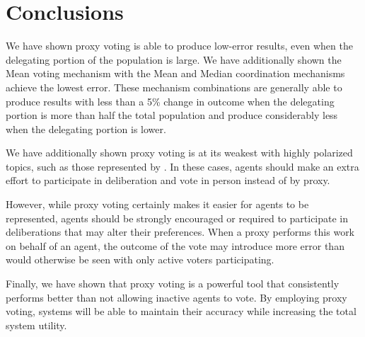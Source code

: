 \section{Conclusions}\label{sec:conclusions}
We have shown proxy voting is able to produce low-error results, even when the
delegating portion of the population is large.
We have additionally shown the Mean voting mechanism with the Mean and Median
coordination mechanisms achieve the lowest error.
These mechanism combinations are generally able to produce results with less than a 5\%
change in outcome when the delegating portion is more than half the total
population and produce considerably less when the delegating portion is lower.

We have additionally shown proxy voting is at its weakest with highly polarized
topics, such as those represented by .
In these cases, agents should make an extra effort to participate in deliberation and
vote in person instead of by proxy.

However, while proxy voting certainly makes it easier for agents to be represented,
agents should be strongly encouraged or required to participate in deliberations that
may alter their preferences.
When a proxy performs this work on behalf of an agent, the outcome of the vote may
introduce more error than would otherwise be seen with only active voters participating.

Finally, we have shown that proxy voting is a powerful tool that consistently
performs better than not allowing inactive agents to vote.
By employing proxy voting, systems will be able to maintain their accuracy while
increasing the total system utility.
